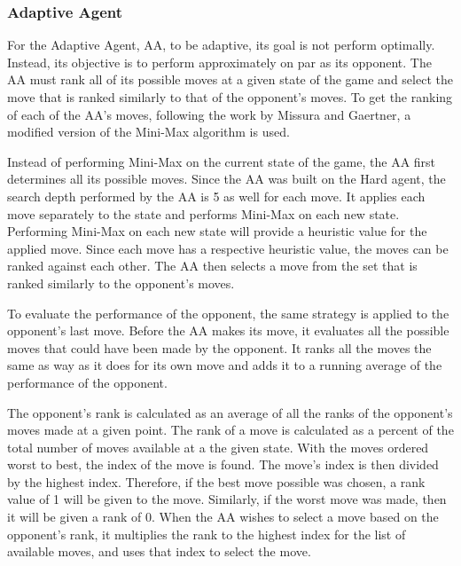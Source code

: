 \documentclass[12pt]{article}
\begin{document}
\subsubsection*{Adaptive Agent}
For the Adaptive Agent, AA, to be adaptive, its goal is not perform optimally. Instead, its objective is to perform approximately on par as its opponent. The AA must rank all of its possible moves at a given state of the game and select the move that is ranked similarly to that of the opponent's moves. To get the ranking of each of the AA's moves, following the work by Missura and Gaertner, a modified version of the Mini-Max algorithm is used.

Instead of performing Mini-Max on the current state of the game, the AA first determines all its possible moves. Since the AA was built on the Hard agent, the search depth performed by the AA is 5 as well for each move. It applies each move separately to the state and performs Mini-Max on each new state. Performing Mini-Max on each new state will provide a heuristic value for the applied move. Since each move has a respective heuristic value, the moves can be ranked against each other. The AA then selects a move from the set that is ranked similarly to the opponent's moves.

To evaluate the performance of the opponent, the same strategy is applied to the opponent's last move. Before the AA makes its move, it evaluates all the possible moves that could have been made by the opponent. It ranks all the moves the same as way as it does for its own move and adds it to a running average of the performance of the opponent.

The opponent's rank is calculated as an average of all the ranks of the opponent's moves made at a given point. The rank of a move is calculated as a percent of the total number of moves available at a the given state. With the moves ordered worst to best, the index of the move is found. The move's index is then divided by the highest index. Therefore, if the best move possible was chosen, a rank value of 1 will be given to the move. Similarly, if the worst move was made, then it will be given a rank of 0. When the AA wishes to select a move based on the opponent's rank, it multiplies the rank to the highest index for the list of available moves, and uses that index to select the move.
\end{document}
